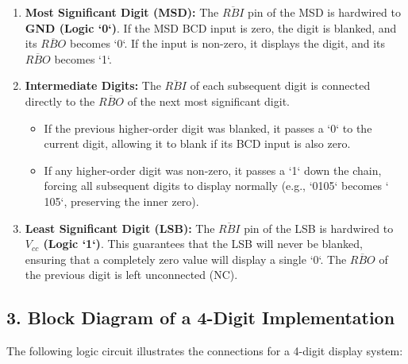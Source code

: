 \documentclass[12pt,a3paper]{article}
\begin{document}
\begin{enumerate}
\begin{tcolorbox}[enhanced,breakable,ansbox,colback=cD!4,colframe=cD,boxrule=0.8pt,arc=5pt,title={\textbf{Answer}},fonttitle=\bfseries\color{white},colbacktitle=cD]
\begin{enumerate}
    \item \textbf{Most Significant Digit (MSD):} The $\overline{RBI}$ pin of the MSD is hardwired to \textcolor{cD}{\textbf{GND (Logic `0`)}}. If the MSD BCD input is zero, the digit is blanked, and its $\overline{RBO}$ becomes `0`. If the input is non-zero, it displays the digit, and its $\overline{RBO}$ becomes `1`.
    \item \textbf{Intermediate Digits:} The $\overline{RBI}$ of each subsequent digit is connected directly to the $\overline{RBO}$ of the next most significant digit. 
    \begin{itemize}
        \item If the previous higher-order digit was blanked, it passes a `0` to the current digit, allowing it to blank if its BCD input is also zero.
        \item If any higher-order digit was non-zero, it passes a `1` down the chain, forcing all subsequent digits to display normally (e.g., `0105` becomes ` 105`, preserving the inner zero).
    \end{itemize}
    \item \textbf{Least Significant Digit (LSB):} The $\overline{RBI}$ pin of the LSB is hardwired to \textcolor{cD}{\textbf{$V_{cc}$ (Logic `1`)}}. This guarantees that the LSB will never be blanked, ensuring that a completely zero value will display a single `0`. The $\overline{RBO}$ of the previous digit is left unconnected (NC).
\end{enumerate}

\vspace{0.3cm}
\subsection*{3. Block Diagram of a 4-Digit Implementation}
The following logic circuit illustrates the connections for a 4-digit display system:

\vspace{0.4cm}
\begin{center}
\end{center}
\end{tcolorbox}
\end{enumerate}
\end{document}
